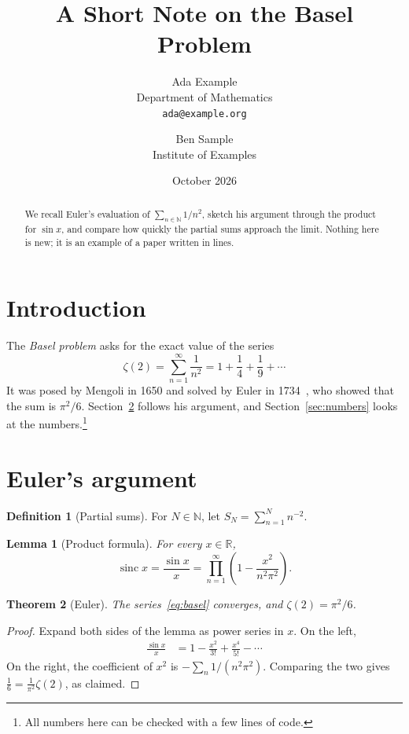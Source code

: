 \documentclass[11pt]{article}
\title{A Short Note on the Basel Problem}
\author{Ada Example \\ Department of Mathematics \\ \texttt{ada@example.org} \and Ben Sample \\ Institute of Examples}
\date{October 2026}
\newcommand{\N}{\mathbb{N}}
\newcommand{\R}{\mathbb{R}}
\newcommand{\partialsum}[1]{S_{#1}}
\DeclareMathOperator{\sinc}{sinc}
\newtheorem{theorem}{Theorem}
\newtheorem{lemma}[theorem]{Lemma}
\theoremstyle{definition}
\newtheorem{defn}{Definition}
\begin{document}
\maketitle

\begin{abstract}
We recall Euler's evaluation of $\sum_{n \in \N} 1/n^2$, sketch his argument through the product for $\sin x$, and compare how quickly the partial sums approach the limit. Nothing here is new; it is an example of a paper written in lines.
\end{abstract}

\section{Introduction}
\label{sec:intro}

The \emph{Basel problem} asks for the exact value of the series
\begin{equation}
  \zeta(2) = \sum_{n=1}^{\infty} \frac{1}{n^2} = 1 + \frac{1}{4} + \frac{1}{9} + \cdots
  \label{eq:basel}
\end{equation}
It was posed by Mengoli in 1650 and solved by Euler in 1734~\cite{euler1740}, who showed that the sum is $\pi^2/6$. Section~\ref{sec:proof} follows his argument, and Section~\ref{sec:numbers} looks at the numbers.\footnote{All numbers here can be checked with a few lines of code.}

\section{Euler's argument}
\label{sec:proof}

\begin{defn}[Partial sums]
For $N \in \N$, let $\partialsum{N} = \sum_{n=1}^{N} n^{-2}$.
\end{defn}

\begin{lemma}[Product formula]
For every $x \in \R$,
\[ \sinc x = \frac{\sin x}{x} = \prod_{n=1}^{\infty} \left( 1 - \frac{x^2}{n^2 \pi^2} \right). \]
\end{lemma}

\begin{theorem}[Euler]
\label{thm:basel}
The series~\eqref{eq:basel} converges, and $\zeta(2) = \pi^2 / 6$.
\end{theorem}

\begin{proof}
Expand both sides of the lemma as power series in $x$. On the left,
\begin{align*}
  \frac{\sin x}{x} &= 1 - \frac{x^2}{3!} + \frac{x^4}{5!} - \cdots
\end{align*}
On the right, the coefficient of $x^2$ is $-\sum_{n} 1/(n^2 \pi^2)$. Comparing the two gives $\frac{1}{6} = \frac{1}{\pi^2} \zeta(2)$, as claimed.
\end{proof}
\end{document}
